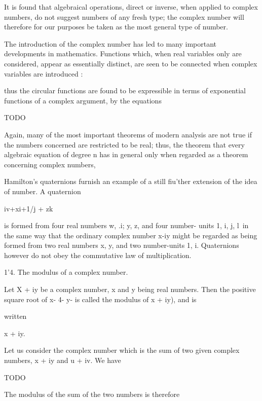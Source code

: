 It is found that algebraical operations, direct or inverse, when
applied to complex numbers, do not suggest numbers of any fresh type;
the complex number will therefore for our purposes be taken as the
most general type of number.

The introduction of the complex number has led to many important
developments in mathematics. Functions which, when real variables only
are considered, appear as essentially distinct, are seen to be
connected when complex variables are introduced :

%
%

thus the circular functions are found to be expressible in terms of
exponential functions of a complex argument, by the equations

TODO

Again, many of the most important theorems of modern analysis are not
true if the numbers concerned are restricted to be real; thus, the
theorem that every algebraic equation of degree n has %
in general only when regarded as a theorem concerning complex numbers,

Hamilton's quaternions furnish an example of a still fiu'ther
extension of the idea of number. A quaternion

iv+xi+1/j + zk

is formed from four real numbers w, .i; y, z, and four number- units
1, i, j, l\ in the same way that the ordinary complex number x-\-iy
might be regarded as being formed from two real numbers x, y, and two
number-units 1, i. Quaternions however do not obey the commutative law
of multiplication.

1'4. The modulus of a complex number.

Let X + iy be a complex number, x and y being real numbers. Then the
positive square root of x- 4- y- is called the modulus of x + iy), and
is

written

x + iy.

Let us consider the complex number which is the sum of two given
complex numbers, x + iy and u + iv. We have

TODO

The modulus of the sum of the two numbers is therefore

